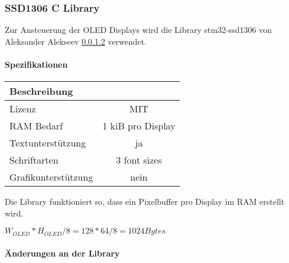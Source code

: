 \subsubsection{SSD1306 C Library}
\label{sec:Library_ssd1306}

Zur Ansteuerung der OLED Displays wird die Library stm32-ssd1306 von Aleksander Alekseev \ref{} verwendet.

\paragraph{Spezifikationen}

\begin{table}[]
\begin{tabular}{|l|c|}
\hline
\textbf{Beschreibung} & \textbf{}         \\ \hline
Lizenz                & MIT               \\ \hline
RAM Bedarf            & 1 kiB pro Display \\ \hline
Textunterstützung     & ja                \\ \hline
Schriftarten          & 3 font sizes      \\ \hline
Grafikunterstützung   & nein              \\ \hline
\end{tabular}
\end{table}

Die Library funktioniert so, dass ein Pixelbuffer pro Display im RAM erstellt wird.


${W_{OLED} * H_{OLED} / 8 = 128 * 64 / 8 = 1024 Bytes}$


\paragraph{Änderungen an der Library}

